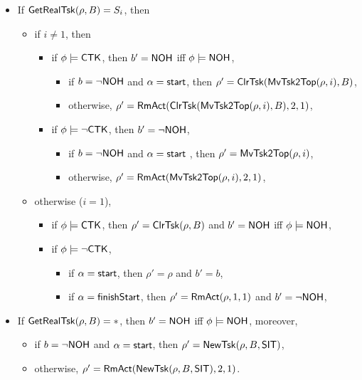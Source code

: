 \smallskip
\noindent {}
\smallskip
\begin{itemize}
	\item If $\mathsf{GetRealTsk}(\rho, B) = S_i$, then
	\begin{itemize}
		\item if $i\neq 1$, then 
		\begin{itemize}
			\item if $\phi\models{\sf CTK}$, then $b' = {\sf NOH}$ iff $\phi \models {\sf NOH}$, 
			\begin{itemize}
				\item if $b = \neg{\sf NOH}$ and $\alpha = {\mathsf{start} }$, then $\rho' = \mathsf{ClrTsk}(\mathsf{MvTsk2Top}(\rho,i), B)$,
				\item otherwise, $\rho' = \mathsf{RmAct}(\mathsf{ClrTsk}(\mathsf{MvTsk2Top}(\rho,i), B), 2, 1)$,
			\end{itemize}
			\item if $\phi\models\neg{\sf CTK}$, then $b' = \neg {\sf NOH}$,
			\begin{itemize}
				\item if $b = \neg{\sf NOH}$ and $\alpha = {\mathsf{start} }$ , then $\rho' = \mathsf{MvTsk2Top}(\rho,i)$,
				\item otherwise, $\rho' = \mathsf{RmAct}(\mathsf{MvTsk2Top}(\rho,i), 2, 1)$,
			\end{itemize}
		\end{itemize}
		\item otherwise ($i = 1$), 
		\begin{itemize}
			\item if $\phi\models{\sf CTK}$, then $\rho' = \mathsf{ClrTsk}(\rho, B)$ and $b' = {\sf NOH}$ iff $\phi \models {\sf NOH}$, 
			\item if $\phi\models\neg{\sf CTK}$, 
			\begin{itemize}
				\item if $\alpha = {\mathsf{start} }$, then $\rho' = \rho$ and $b' = b$,
				\item if $\alpha = {\mathsf{finishStart} }$, then $\rho' = \mathsf{RmAct}(\rho, 1, 1)$ and $b' = \neg{\sf NOH}$,
			\end{itemize}
		\end{itemize}
	\end{itemize}
	\item If $\mathsf{GetRealTsk}(\rho, B) = *$, then $b' = {\sf NOH}$ iff $\phi \models {\sf NOH}$, moreover, 
	\begin{itemize}
		\item if $b = \neg {\sf NOH}$ and $\alpha = {\mathsf{start} }$, then $\rho' = \mathsf{NewTsk}(\rho, B, {\sf SIT})$, 
		\item otherwise, $\rho' = \mathsf{RmAct}(\mathsf{NewTsk}(\rho, B, {\sf SIT}), 2, 1)$.
	\end{itemize}				
\end{itemize}

